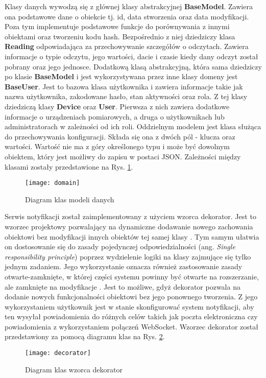 Klasy danych wywodzą się z głównej klasy abstrakcyjnej \textbf{BaseModel}.
Zawiera ona podstawowe dane o obiekcie tj. id, data stworzenia oraz data modyfikacji.
Poza tym implementuje podstawowe funkcje do porównywania z innymi obiektami oraz
tworzeniu kodu hash. Bezpośrednio z niej dziedziczy klasa \textbf{Reading} odpowiadająca
za przechowywanie szczegółów o odczytach. Zawiera informacje o typie odczytu, jego wartości,
dacie i czasie kiedy dany odczyt został pobrany oraz jego jednosce.
Dodatkową klasą abstrakcyjną, która sama dziedziczy po klasie \textbf{BaseModel} i
jest wykorzystywana przez inne klasy domeny jest \textbf{BaseUser}. Jest to bazowa klasa
użytkownika i zawiera informacje takie jak nazwa użytkownika, zakodowane hasło, stan aktywności
oraz rola. Z tej klasy dziedziczą klasy \textbf{Device} oraz \textbf{User}. Pierwsza z nich 
zawiera dodatkowe informacje o urządzeniach pomiarowych, a druga o użytkownikach lub administratorach 
w zależności od ich roli.
Oddzielnym modelem jest klasa służąca do przechowywania konfiguracji. Składa się ona z dwóch pól -
klucza oraz wartości. Wartość nie ma z góry określonego typu i może być dowolnym obiektem, który
jest możliwy do zapisu w postaci JSON.
Zależności między klasami zostały przedstawione na Rys. \ref{diagram:domain}.
\begin{figure}[h!]
  \centering
  \texttt{[image: domain]}
  \caption{Diagram klas modeli danych}
  \label{diagram:domain}
\end{figure}

Serwis notyfikacji został zaimplementowany z użyciem wzorca dekorator.
Jest to wzorzec projektowy pozwalający na dynamiczne dodawanie nowego
zachowania obiektowi bez modyfikacji innych obiektów tej samej klasy
\cite{freeman2004head}. Tym samym ułatwia on dostosowanie się do zasady
pojedynczej odpowiedzialności (ang. \textit{Single responsibility principle})
poprzez wydzielenie logiki na klasy zajmujące się tylko jednym zadaniem.
Jego wykorzystanie oznacza również zastosowanie zasady otwarte-zamknięte, w
której części systemu powinny być otwarte na rozszerzanie, ale zamknięte
na modyfikacje \cite{meyer1988object}. Jest to możliwe, gdyż dekorator pozwala
na dodanie nowych funkcjonalności obiektowi bez jego ponownego tworzenia.
Z jego wykorzystaniem użytkownik jest w stanie skonfigurować system notyfikacji,
aby ten wysyłał powiadomienia do różnych celów takich jak poczta elektroniczna
czy powiadomienia z wykorzystaniem połączeń WebSocket. Wzorzec dekorator został
przedstawiony za pomocą diagramu klas na Rys. \ref{pattern:decorator}.
\begin{figure}[h!]
  \centering
  \texttt{[image: decorator]}
  \caption{Diagram klas wzorca dekorator}
  \label{pattern:decorator}
\end{figure}

